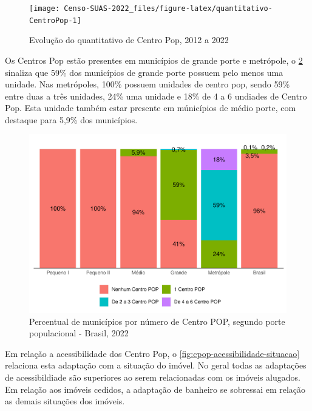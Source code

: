 \documentclass[
  brazilian]{report}
\begin{document}
\begin{figure}
\texttt{[image: Censo-SUAS-2022\_files/figure-latex/quantitativo-CentroPop-1]} \caption[Evolução do quantitativo de Centro Pop, 2012 a 2022]{Evolução do quantitativo de Centro Pop, 2012 a 2022}\label{fig:quantitativo-CentroPop}
\end{figure}

Os Centros Pop estão presentes em municípios de grande porte e
metrópole, o \cref{fig:cpop-porte} sinaliza que 59\% dos municípios de
grande porte possuem pelo menos uma unidade. Nas metrópoles, 100\%
possuem unidades de centro pop, sendo 59\% entre duas a três unidades,
24\% uma unidade e 18\% de 4 a 6 undiades de Centro Pop. Esta unidade
também estar presente em múnicípios de médio porte, com destaque para
5,9\% dos municípios.

\begin{figure}
\includegraphics{Censo-SUAS-2022_files/figure-latex/cpop-porte-1} \caption[Percentual de municípios por número de Centro POP, segundo porte populacional - Brasil, 2022]{Percentual de municípios por número de Centro POP, segundo porte populacional - Brasil, 2022}\label{fig:cpop-porte}
\end{figure}

Em relação a acessibilidade dos Centro Pop, o
\cref{fig:cpop-acessibilidade-situacao} relaciona esta adaptação com a
situação do imóvel. No geral todas as adaptações de acessibildiade são
superiores ao serem relacionadas com os imóveis alugados. Em relação aos
imóveis cedidos, a adaptação de banheiro se sobressai em relação as
demais situações dos imóveis.
\end{document}
